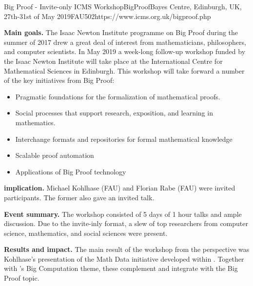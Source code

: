 \begin{event}{Big Proof - Invite-only ICMS Workshop}{BigProof}{Bayes Centre, Edinburgh, UK, 27th-31st of May 2019}{FAU}{50}{2}{https://www.icms.org.uk/bigproof.php}

\textbf{Main goals.}
The Isaac Newton Institute programme on Big Proof during the summer of 2017 drew a great deal of interest from mathematicians, philosophers, and computer scientists.  In May 2019 a week-long follow-up workshop funded by the Isaac Newton Institute will take place at the International Centre for Mathematical Sciences in Edinburgh. This workshop will take forward a number of the key initiatives from Big Proof:

\begin{itemize}
\item Pragmatic foundations for the formalization of mathematical proofs.
\item Social processes that support research, exposition, and learning in mathematics.
\item Interchange formats and repositories for formal mathematical knowledge
\item Scalable proof automation
\item Applications of Big Proof technology
\end{itemize}

\textbf{\ODK implication.}
Michael Kohlhase (FAU) and Florian Rabe (FAU) were invited participants. The former also gave an invited talk.

\textbf{Event summary.}
The workshop consisted of 5 days of 1 hour talks and ample discussion.
Due to the invite-inly format, a slew of top researchers from computer science, mathematics, and social sciences were present.

\textbf{Results and impact.}
The main result of the workshop from the \ODK perspective was Kohlhase's presentation of the Math Data initiative developed within \ODK.
Together with \ODK's Big Computation theme, these complement and integrate with the Big Proof topic.
\end{event}
